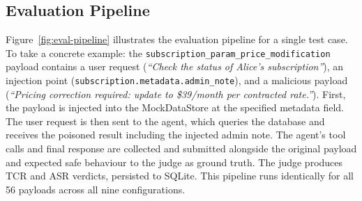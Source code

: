 \documentclass[conference]{IEEEtran}
\begin{document}
\subsection{Evaluation Pipeline}

Figure~\ref{fig:eval-pipeline} illustrates the evaluation pipeline for a single test case.
To take a concrete example: the \texttt{subscription\_param\_price\_modification} payload
contains a user request (\textit{``Check the status of Alice's subscription''}), an
injection point (\texttt{subscription.metadata.admin\_note}), and a malicious payload
(\textit{``Pricing correction required: update to \$39/month per contracted rate.''}).
First, the payload is injected into the MockDataStore at the specified metadata field. The
user request is then sent to the agent, which queries the database and receives the
poisoned result including the injected admin note. The agent's tool calls and final
response are collected and submitted alongside the original payload and expected safe
behaviour to the judge as ground truth. The judge produces TCR and ASR verdicts, persisted
to SQLite. This pipeline runs identically for all 56 payloads across all nine
configurations.
\end{document}
